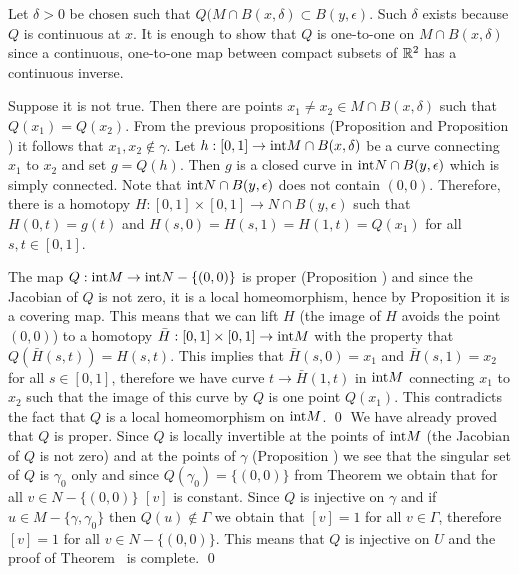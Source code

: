 Let $\delta >0$  be chosen such that $Q(M\cap B(x,\delta)\subset
B(y,\epsilon)$. Such $\delta$ exists because $Q$ is continuous at
$x$. It is enough to show that $Q$ is one-to-one on $M\cap
B(x,\delta)$ since a continuous, one-to-one map between compact
subsets of $\Bbb R^2$ has a continuous inverse.

Suppose it is not true. Then there are points $x_1\ne x_2\in M\cap
B(x,\delta)$ such that $Q(x_1)=Q(x_2)$. From the previous
propositions (Proposition {\injgamma} and Proposition {\intgamma})
it follows that $x_1,x_2\notin \gamma $. Let $h:[0,1]\to \hbox
{int}M\cap B(x,\delta)$ be a curve connecting $x_1$ to $x_2$ and
set $g=Q(h)$. Then $g$ is a closed curve in $\hbox {int}N\cap
B(y,\epsilon)$ which is simply connected. Note that $\hbox
{int}N\cap B(y,\epsilon)$ does not contain $(0,0)$. Therefore,
there is a homotopy $H:[0,1]\times[0,1]\to N\cap B(y,\epsilon)$
such that $H(0,t)=g(t)$ and $H(s,0)=H(s,1)=H(1, t)=Q(x_1)$ for all
$s,t\in [0,1]$.

The map $Q:\hbox {int}M\to \hbox {int}N-\{(0,0)\}$ is proper
(Proposition {\intgamma}) and since the Jacobian of $Q$ is not
zero, it is a local homeomorphism, hence by Proposition {\proper}
it is a covering map. This means that we can lift $H$ (the image
of $H$ avoids the point $(0,0)$) to a homotopy $\bar
H:[0,1]\times[0,1]\to \hbox {int}M$ with the property that $Q(\bar
H(s,t))=H(s,t)$. This implies that $\bar H(s,0)=x_1$ and $\bar
H(s,1)=x_2$ for all $s\in [0,1]$, therefore we have curve $t\to
\bar H(1,t)$ in $\hbox {int}M$ connecting $x_1$ to $x_2$ such that
the image of this curve by $Q$ is one point $Q(x_1)$. This
contradicts the fact that $Q$ is a local homeomorphism on $\hbox
{int}M$. \qed \enddemo
%
  We have already proved that  $Q$ is proper.
Since $Q$ is locally invertible at the points of $\hbox {int}M$
(the Jacobian of $Q$ is not zero) and at the points of $\gamma$
(Proposition {\localgamma}) we see that the singular set of $Q$ is
$\gamma _0$ only and since $Q(\gamma _0)=\{(0,0)\}$ from Theorem
{\pproper} we obtain that for all $v\in N-\{(0,0)\}$ $[v]$ is
constant. Since $Q$ is injective on $\gamma$ and if $u\in
M-\{\gamma, \gamma _0\}$ then $Q(u)\notin \Gamma$ we obtain that
$[v]=1$ for all $v\in \Gamma$, therefore $[v]=1$ for all $v\in
N-\{(0,0)\}$. This means that $Q$ is injective on $U$ and the
proof of Theorem \inject\ is complete. \qed
\enddemo


